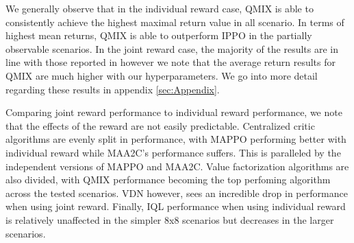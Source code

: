 \documentclass[systems,article,submit,pdftex,moreauthors]{Definitions/mdpi}
\begin{document}
\begin{table}[!h]
\caption{Mean return values and 95\% confidence interval of algorithms using joint reward in selected scenarios over 10 seeds after a hyperparameter search was completed. Bolded values indicate the best result in a scenario.}
\label{tab:New hyperparameter LBF search average returns}
\end{table}


We generally observe that in the individual reward case, QMIX is able to consistently achieve the highest maximal return value in all scenario. In terms of highest mean returns, QMIX is able to outperform IPPO in the partially observable scenarios.  
In the joint reward case, the majority of the results are in line with those reported in \cite{DBLP:Benchmarking} however we note that the average return results for QMIX are much higher with our hyperparameters. We go into more detail regarding these results in appendix \ref{sec:Appendix}. 

Comparing joint reward performance to individual reward performance, we note that the effects of the reward are not easily predictable. Centralized critic algorithms are evenly split in performance, with MAPPO performing better with individual reward while MAA2C's performance suffers. This is paralleled by the independent versions of MAPPO and MAA2C. Value factorization algorithms are also divided, with QMIX performance becoming the top perfoming algorithm across the tested scenarios. VDN however, sees an incredible drop in performance when using joint reward. Finally, IQL performance when using individual reward is relatively unaffected in the simpler 8x8 scenarios but decreases in the larger scenarios. 
\end{document}
